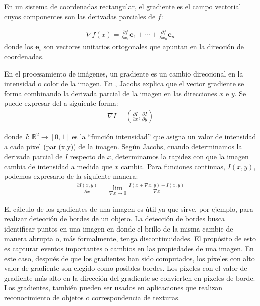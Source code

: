 	En un sistema de coordenadas rectangular, el gradiente es el campo vectorial cuyos componentes son las derivadas parciales de $f$:
		 
		 \begin{align*}
		 	\nabla f(x) = \frac{\partial f}{\partial x_1}\mathbf{e}_1 + \cdots + \frac{\partial f}{\partial x_n }\mathbf{e}_n
		 \end{align*}
	donde los $\mathbf{e}_i$ son vectores unitarios ortogonales que apuntan en la dirección de coordenadas.

	En el procesamiento de imágenes, un gradiente es un cambio direccional en la intensidad o color de la imagen. En \cite{DJacobs}, Jacobs explica que el vector gradiente se forma combinando la derivada parcial de la imagen en las direcciones $x$ e $y$. Se puede expresar del a siguiente forma:
		\begin{align}
			\nabla I = \left( \frac{\partial I}{\partial x} , \frac{\partial I}{\partial y} \right)
		\end{align}	
		
	donde \textit{I}: $\mathbb{R}^{2} \rightarrow [0, 1]$ es la ``función intensidad'' que asigna un valor de intensidad a cada pixel (par (x,y)) de la imagen. Según Jacobs, cuando determinamos la derivada parcial de $I$ respecto de $x$, determinamos la rapidez con que la imagen cambia de intensidad a medida que $x$ cambia. Para funciones continuas, $I(x,y)$, podemos expresarlo de la siguiente manera:
	\begin{align}
		\frac{\partial I(x,y)}{\partial x} = \lim_{\nabla x\rightarrow 0} \frac{I(x + \nabla x, y) - I(x,y)}{\nabla x}	
	\end{align}
	
	 El cálculo de los gradientes de una imagen es útil ya que sirve, por ejemplo, para realizar detección de bordes de un objeto. La detección de bordes busca identificar puntos en una imagen en donde el brillo de la misma cambie de manera abrupta o, más formalmente, tenga discontinuidades. El propósito de esto es capturar eventos importantes o cambios en las propiedades de una imagen. En este caso, después de que los gradientes han sido computados, los píxeles con alto valor de gradiente son elegido como posibles bordes. Los píxeles con el valor de gradiente más alto en la dirección del gradiente se convierten en píxeles de borde. Los gradientes, también pueden ser usados en aplicaciones que realizan reconocimiento de objetos o correspondencia de texturas.	 